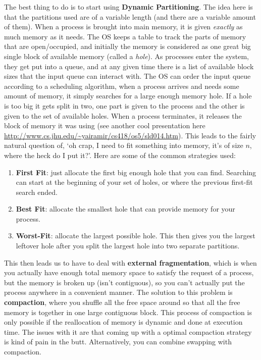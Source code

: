 \documentclass{article}
\begin{document}
The best thing to do is to start using {\bf Dynamic Partitioning}. The idea here is that the partitions used are of a variable length (and there are a variable amount of them). When a process is brought into main memory, it is given \emph{exactly} as much memory as it needs. The OS keeps a table to track the parts of memory that are open/occupied, and initially the memory is considered as one great big single block of available memory (called a \emph{hole}). As processes enter the system, they get put into a queue, and at any given time there is a list of available block sizes that the input queue can interact with. The OS can order the input queue according to a scheduling algorithm, when a process arrives and needs some amount of memory, it simply searches for a large enough memory hole. If a hole is too big it gets split in two, one part is given to the process and the other is given to the set of available holes. When a process terminates, it releases the block of memory it was using (see another cool presentation here \url{http://www.cs.jhu.edu/~yairamir/cs418/os5/sld014.htm}). This leads to the fairly natural question of, `oh crap, I need to fit something into memory, it's of size $n$, where the heck do I put it?'. Here are some of the common strategies used:
\begin{enumerate}
\item {\bf First Fit}: just allocate the first big enough hole that you can find. Searching can start at the beginning of your set of holes, or where the previous first-fit search ended. 
\item {\bf Best Fit}: allocate the smallest hole that can provide memory for your process.
\item {\bf Worst-Fit}: allocate the largest possible hole. This then gives you the largest leftover hole after you split the largest hole into two separate partitions. 
\end{enumerate}

This then leads us to have to deal with {\bf external fragmentation}, which is when you actually have enough total memory space to satisfy the request of a process, but the memory is broken up (isn't contiguous), so you can't actually put the process anywhere in a convenient manner. The solution to this problem is {\bf compaction}, where you shuffle all the free space around so that all the free memory is together in one large contiguous block. This process of compaction is only possible if the reallocation of memory is dynamic and done at execution time. The issues with it are that coming up with a optimal compaction strategy is kind of pain in the butt. Alternatively, you can combine swapping with compaction. 
\end{document}

